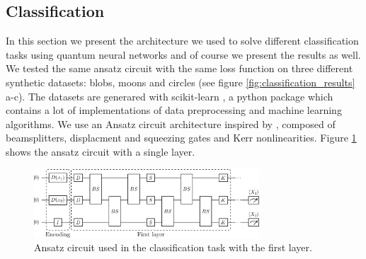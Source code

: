 \documentclass[12pt, a4paper,  nobibnotes]{article}
\begin{document}
\subsection{Classification}
\label{sec:classification-results}
In this section we present the architecture we used to solve different classification tasks
using quantum neural networks and of course we present the results as well. We tested 
the same ansatz circuit with the same loss function on three different synthetic datasets:
blobs, moons and circles (see figure \ref{fig:classification_results} a-c).
The datasets are generared with scikit-learn \cite{scikit-learn}, a python package which 
contains a lot of implementations of data preprocessing and machine learning algorithms. 
We use an Ansatz circuit architecture inspired by \cite{CVQNNLLoyd}, composed of beamsplitters, 
displacment and squeezing gates and Kerr nonlinearities. Figure \ref{fig:single_layer_classification}
shows the ansatz circuit with a single layer.

\begin{figure}[H]
    \centering
    \includegraphics[width=0.75\textwidth]{figures/Classifier-Circles-Ansatz.pdf}
    \caption{Ansatz circuit used in the classification task with the first layer.}
    \label{fig:single_layer_classification}
\end{figure}
\end{document}
